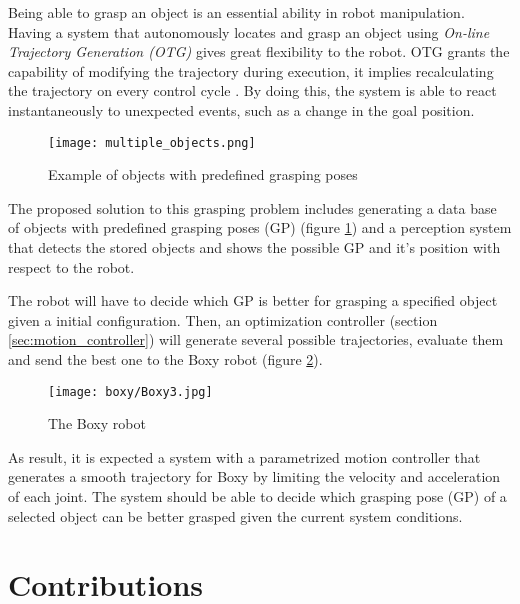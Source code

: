 Being able to grasp an object is an essential ability in robot manipulation. Having a system that autonomously locates and grasp an object using \textit{On-line Trajectory Generation (OTG)} gives great flexibility to the robot. OTG grants the capability of modifying the trajectory during execution, it implies recalculating the trajectory on every control cycle . By doing this, the system is able to react instantaneously to unexpected events, such as a change in the goal position.

\begin{figure}[H]
	\centering
	\texttt{[image: multiple\_objects.png]}
	\vspace{-10pt}
	\caption{Example of objects with predefined grasping poses}
	\vspace{-15pt}
	\label{fig:obj_grasp_pose}
\end{figure}

The proposed solution to this grasping problem includes generating a data base of objects with predefined grasping poses (GP) (figure \ref{fig:obj_grasp_pose}) and a perception system that detects the stored objects and shows the possible GP and it's position with respect to the robot.

The robot will have to decide which GP is better for grasping a specified object given a initial configuration. Then, an optimization controller (section \ref{sec:motion_controller}) will generate several possible trajectories, evaluate them and send the best one to the Boxy robot (figure \ref{fig:boxy}).

\begin{figure}[H]
	\centering
	\texttt{[image: boxy/Boxy3.jpg]}
	\vspace{-10pt}
	\caption{The Boxy robot}
	\vspace{-15pt}
	\label{fig:boxy}
\end{figure}

As result, it is expected a system with a parametrized motion controller that generates a smooth trajectory for Boxy by limiting the velocity and acceleration of each joint. The system should be able to decide which grasping pose (GP) of a selected object can be better grasped given the current system conditions.


\section{Contributions}

